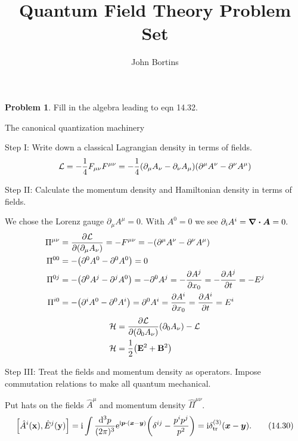\documentclass[letterpaper]{article}
\title{Quantum Field Theory Problem Set}
\author{John Bortins}
\theoremstyle{definition}
\newtheorem{prob}{Problem}[section]
\begin{document}
\maketitle{}


\begin{prob}
  Fill in the algebra leading to eqn 14.32.
\end{prob}
The canonical quantization machinery

Step I: Write down a classical Lagrangian density in terms of fields.\[\mathcal{L}=-\frac{1}{4}F_{\mu\nu}F^{\mu\nu}=-\frac{1}{4}\pqty{\partial_\mu A_\nu-\partial_\nu A_\mu}\pqty{\partial^\mu A^\nu-\partial^\nu A^\mu}\]

Step II: Calculate the momentum density and Hamiltonian density in terms of fields.

We chose the Lorenz gauge \(\partial_\mu A^\mu=0.\) With \(A^0=0\) we see \(\partial_i A^i=\div \vb*{A}=0.\)
\begin{align*}
  \Pi^{\mu\nu} & =\pdv{\mathcal{L}}{(\partial_\mu A_\nu)}=-F^{\mu\nu}=-\pqty{\partial^\mu A^\nu-\partial^\nu A^\mu} \\
  \Pi^{00}     & =-\pqty{\partial^0 A^0-\partial^0 A^0}=0                                                           \\
  \Pi^{0j}     & =-\pqty{\partial^0 A^j-\partial^j A^0}=-\partial^0 A^j=-\pdv{A^j}{x_0}=-\pdv{A^j}{t}=-E^j          \\
  \Pi^{i0}     & =-\pqty{\partial^i A^0-\partial^0 A^i}= \partial^0 A^i=\pdv{A^i}{x_0}=\pdv{A^i}{t}=E^i             \\
\end{align*}
\begin{align*}
  \mathcal{H} & ={\pdv{\mathcal{L}}{(\partial_0 A_\nu)}}   (\partial_0 A_\nu)-\mathcal{L} \\
  \mathcal{H} & =\frac{1}{2}\pqty{\vb{E}^2+\vb{B}^2}                                      \\
\end{align*}

Step III: Treat the fields and momentum density as operators. Impose commutation relations to make all quantum mechanical.

Put hats on the fields \(\hat{A}^\mu\) and momentum density \(\hat{\Pi}^{\mu\nu}\).\[\comm{\hat{A}^i(\vb{x})}{\hat{E}^j(\vb{y})}=\text{i}\int\frac{\dd[3]{p}}{(2\pi)^3}\text{e}^{\text{i}\vb*{p}\cdot(\vb*{x}-\vb*{y})}\pqty{\delta^{ij}-\frac{p^i p^j}{p^2}}=\text{i}\delta^{(3)}_{\text{tr}}(\vb*{x}-\vb*{y}).\qquad(14.30)\]
\end{document}
